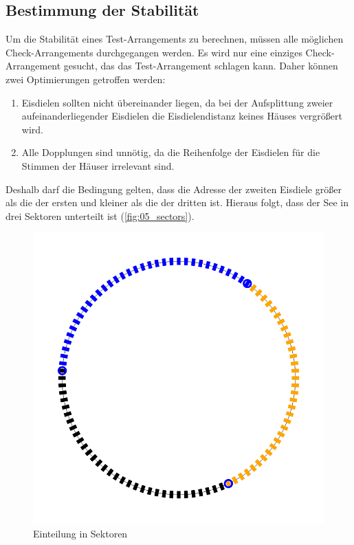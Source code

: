 \documentclass[a4paper,10pt,ngerman]{scrartcl}
\newcommand{\imageWidth}{0.3\linewidth}
\begin{document}
\subsection{Bestimmung der Stabilität}
\label{sec:Bestimmung_der_Stabilität}
Um die Stabilität eines Test-Arrangements zu berechnen, müssen alle möglichen Check-Arrangements durchgegangen werden.
Es wird nur eine einziges Check-Arrangement gesucht, das das Test-Arrangement schlagen kann.
Daher können zwei Optimierungen getroffen werden:
\begin{enumerate}
    \item Eisdielen sollten nicht übereinander liegen, da bei der Aufsplittung zweier aufeinanderliegender Eisdielen die Eisdielendistanz keines Häuses vergrößert wird.
    \item Alle Dopplungen sind unnötig, da die Reihenfolge der Eisdielen für die Stimmen der Häuser irrelevant sind.
\end{enumerate}
Deshalb darf die Bedingung gelten, dass die Adresse der zweiten Eisdiele größer als die der ersten und kleiner als die der dritten ist.
Hieraus folgt, dass der See in drei Sektoren unterteilt ist (\autoref{fig:05_sectors}).
\begin{figure}[h!]
    \centering
    \caption{Einteilung in Sektoren}
    \label{fig:05_sectors}
    \includegraphics[width=\imageWidth]{05_sectors.png}
\end{figure}
\end{document}
